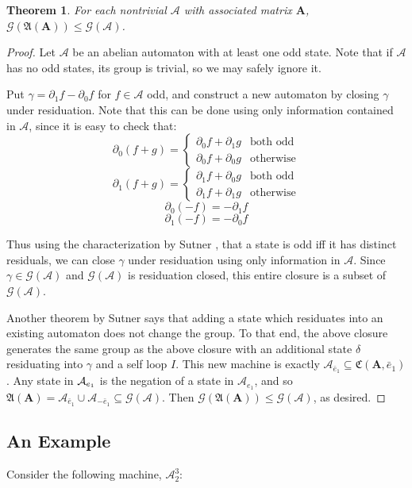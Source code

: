 \documentclass{article}
\newcommand{\A}{\mathcal{A}}
\newcommand{\G}{\mathcal{G}}
\renewcommand{\P}{\mathfrak{A}}
\newcommand{\2}{\textbf{2}}
\newcommand{\Am}{\textbf{A}}
\newcommand{\del}{\partial}
\newcommand{\e}{\bar{e}}
\newtheorem{thm}{Theorem}
\theoremstyle{definition}
\begin{document}
\begin{thm}
  For each nontrivial $\A$ with associated matrix $\Am$, 
  $\G(\P(\Am)) \leq \G(\A)$.
\end{thm}

\begin{proof}
  Let $\A$ be an abelian automaton with at least one odd state.
  Note that if $\A$ has no odd states, its group is trivial, so we may
  safely ignore it.

  Put $\gamma = \del_1 f - \del_0 f$ for $f \in \A$ odd, and construct
  a new automaton by closing $\gamma$ under residuation.
  Note that this can be done using only information contained in $\A$,
  since it is easy to check that:
  \[
    \del_0(f + g) = \begin{cases} \del_0 f + \del_1 g & \text{both odd}\\
                                  \del_0 f + \del_0 g & \text{otherwise}
                    \end{cases}
  \]
  \[
    \del_1(f + g) = \begin{cases} \del_1 f + \del_0 g & \text{both odd}\\
                                  \del_1 f + \del_1 g & \text{otherwise}
                    \end{cases}
  \]
  \[
    \del_0 (-f) = - \del_1 f
  \]
  \[
    \del_1 (-f) = - \del_0 f
  \]

  Thus using the characterization by Sutner \cite{Sutner18:abelian_automata}, 
  that a state is odd iff it has distinct residuals, we can close $\gamma$ 
  under residuation using only information in $\A$.
  Since $\gamma \in \G(\A)$ and $\G(\A)$ is residuation closed, 
  this entire closure is a subset of $\G(\A)$. 

  Another theorem by Sutner \cite{Sutner18:abelian_automata} says that 
  adding a state which residuates into an existing automaton does not 
  change the group. To that end, the above closure generates the same group
  as the above closure with an additional state $\delta$ residuating into 
  $\gamma$ and a self loop $I$. This new machine is exactly 
  $\A_{\e_1} \subseteq \mathfrak{C}(\Am,\e_1)$. Any state in $\A_{\-e_1}$ is
  the negation of a state in $\A_{e_1}$, and so 
  $\P(\Am) = \A_{\e_1} \cup \A_{-\e_1} \subseteq \G(\A)$. 
  Then $\G(\P(\Am)) \leq \G(\A)$, as desired.
\end{proof}

\subsection{An Example}
Consider the following machine, $\A^3_2$:
\end{document}
